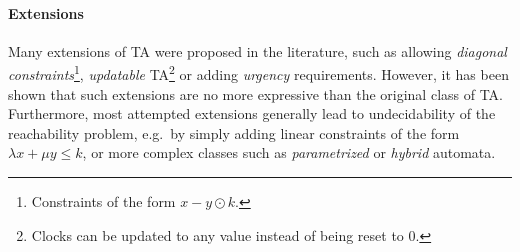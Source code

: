\documentclass[11pt]{article}
\theoremstyle{definition}
\theoremstyle{remark}
\theoremstyle{definition}
\begin{document}
\paragraph{Extensions}\label{par:ta_ext}
Many extensions of TA were proposed in the literature, such as allowing \emph{diagonal constraints}\footnote{Constraints of the form $x - y \odot k$.}, \emph{updatable} TA\footnote{Clocks can be updated to any value instead of being reset to 0.} or adding \emph{urgency} requirements. However, it has been shown that such extensions are no more expressive than the original class of TA. Furthermore, most attempted extensions generally lead to undecidability of the reachability problem, e.g.\ by simply adding linear constraints of the form $\lambda x + \mu y \leq k$, or more complex classes such as \emph{parametrized} or \emph{hybrid} automata.




\end{document}
